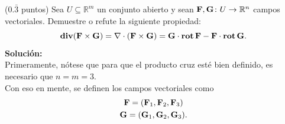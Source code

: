 \documentclass{fmbvecto}
\begin{document}
\begin{problema}
    (\(0.\bar{3}\) puntos) Sea \(U \subseteq \mathbb{R}^{m}\) un conjunto abierto y sean \(\boldsymbol{{\mathbf{F}}},\boldsymbol{{\mathbf{G}}}\colon U\to \mathbb{R}^{n}\) campos vectoriales. Demuestre o refute la siguiente propiedad:
\[\operatorname{\mathbf{div}} (\boldsymbol{{\mathbf{F}}} \times \boldsymbol{{\mathbf{G}}}) = \nabla \cdot (\boldsymbol{{\mathbf{F}}} \times \boldsymbol{{\mathbf{G}}}) = \boldsymbol{{\mathbf{G}}}\cdot \operatorname{\mathbf{rot}}\boldsymbol{{\mathbf{F}}} - \boldsymbol{{\mathbf{F}}}\cdot \operatorname{\mathbf{rot}} \boldsymbol{{\mathbf{G}}}.\]
\tcblower
\textbf{Solución:}\\

Primeramente, nótese que para que el producto cruz esté bien definido, es necesario que \(n = m = 3\). \\

Con eso en mente, se definen los campos vectoriales como
\begin{gather*}
    \boldsymbol{{\mathbf{F}}} = (\boldsymbol{{\mathbf{F}}}_1, \boldsymbol{{\mathbf{F}}}_2, \boldsymbol{{\mathbf{F}}}_3) \\
    \boldsymbol{{\mathbf{G}}} = (\boldsymbol{{\mathbf{G}}}_1, \boldsymbol{{\mathbf{G}}}_2, \boldsymbol{{\mathbf{G}}}_3).
\end{gather*}


\end{problema}
\end{document}
